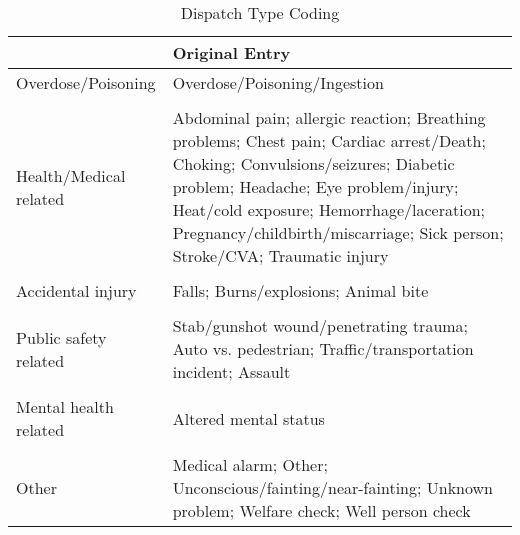 \begin{table}[htbp] \centering
\def\sym#1{\ifmmode^{#1}\else\(^{#1}\)\fi}
  \caption{Dispatch Type Coding} %
  \begin{adjustbox}{max width=\linewidth}\begin{tabular}{p{6cm} p{10cm}}
    \toprule
     & Original Entry \\ 
    \midrule
    Overdose/Poisoning & Overdose/Poisoning/Ingestion \\
    \vspace{.05em} \\
    Health/Medical related & Abdominal pain; allergic reaction; Breathing problems; Chest pain; Cardiac arrest/Death; Choking; Convulsions/seizures; Diabetic problem; Headache; Eye problem/injury; Heat/cold exposure; Hemorrhage/laceration; Pregnancy/childbirth/miscarriage; Sick person; Stroke/CVA; Traumatic injury \\
    \vspace{.05em} \\
    Accidental injury & Falls; Burns/explosions; Animal bite \\
    \vspace{.05em} \\
    Public safety related & Stab/gunshot wound/penetrating trauma; Auto vs. pedestrian; Traffic/transportation incident; Assault \\
    \vspace{.05em} \\
    Mental health related & Altered mental status \\
    \vspace{.05em} \\
    Other & Medical alarm; Other; Unconscious/fainting/near-fainting; Unknown problem; Welfare check; Well person check \\
    \bottomrule
\end{tabular} \end{adjustbox}
\end{table}